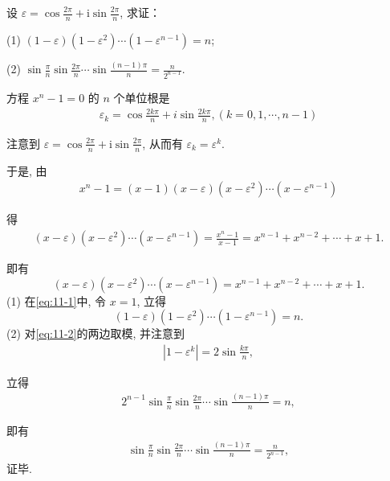 \begin{example}
	设 $\varepsilon=\cos \frac{2 \pi}{n}+\mathrm{i} \sin \frac{2 \pi}{n}$, 求证：

	(1) $(1-\varepsilon)\left(1-\varepsilon^2\right) \cdots\left(1-\varepsilon^{n-1}\right)=n$;

	(2) $\sin \frac{\pi}{n} \sin \frac{2 \pi}{n} \cdots \sin \frac{(n-1) \pi}{n}=\frac{n}{2^{n-1}}$.
\end{example}
\begin{solution}
	方程 $x^n-1=0$ 的 $n$ 个单位根是
	\begin{align*}
		\varepsilon_k=\cos \frac{2 k \pi}{n}+i \sin \frac{2 k \pi}{n},(k=0,1, \cdots, n-1)
	\end{align*}

	注意到 $\varepsilon=\cos \frac{2 \pi}{n}+\mathrm{i} \sin \frac{2 \pi}{n}$, 从而有 $\varepsilon_k=\varepsilon^k$.

	于是, 由
	\begin{align*}
		x^n-1=(x-1)(x-\varepsilon)\left(x-\varepsilon^2\right) \cdots\left(x-\varepsilon^{n-1}\right)
	\end{align*}

	得
	\begin{align*}
		(x-\varepsilon)\left(x-\varepsilon^2\right) \cdots\left(x-\varepsilon^{n-1}\right)=\frac{x^n-1}{x-1}=x^{n-1}+x^{n-2}+\cdots+x+1 .
	\end{align*}

	即有
	\begin{equation}\label{eq:11-1}
		(x-\varepsilon)\left(x-\varepsilon^2\right) \cdots\left(x-\varepsilon^{n-1}\right)=x^{n-1}+x^{n-2}+\cdots+x+1 .
	\end{equation}
	(1) 在\autoref{eq:11-1}中, 令 $x=1$, 立得
	\begin{equation}\label{eq:11-2}
		(1-\varepsilon)\left(1-\varepsilon^2\right) \cdots\left(1-\varepsilon^{n-1}\right)=n .
	\end{equation}
	(2) 对\autoref{eq:11-2}的两边取模, 并注意到
	\begin{align*}
		\left|1-\varepsilon^k\right|=2 \sin \frac{k \pi}{n},
	\end{align*}

	立得
	\begin{align*}
		2^{n-1} \sin \frac{\pi}{n} \sin \frac{2 \pi}{n} \cdots \sin \frac{(n-1) \pi}{n}=n,
	\end{align*}

	即有
	\begin{align*}
		\sin \frac{\pi}{n} \sin \frac{2 \pi}{n} \cdots \sin \frac{(n-1) \pi}{n}=\frac{n}{2^{n-1}},
	\end{align*}
	证毕.
\end{solution}


